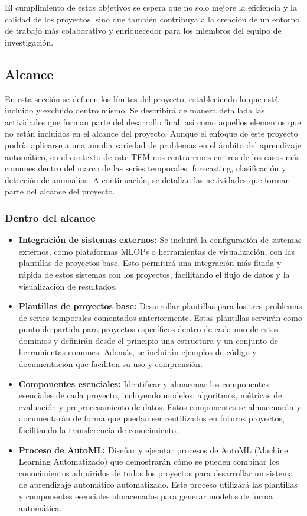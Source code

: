 El cumplimiento de estos objetivos se espera que no solo mejore la eficiencia y la calidad de los 
proyectos, sino que también contribuya a la creación de un entorno de trabajo más colaborativo y
enriquecedor para los miembros del equipo de investigación.

\subsection{Alcance}
En esta sección se definen los límites del proyecto, estableciendo lo que está
incluido y excluido dentro mismo. Se describirá de manera detallada las
actividades que forman parte del desarrollo final, así como aquellos elementos
que no están incluidos en el alcance del proyecto. Aunque el enfoque de este 
proyecto podría aplicarse a una amplia variedad de problemas en el ámbito del 
aprendizaje automático, en el contexto de este TFM nos centraremos en tres de 
los casos más comunes dentro del marco de las series temporales: forecasting, 
clasificación y detección de anomalías. A continuación, se detallan las 
actividades que forman parte del alcance del proyecto.

\subsubsection{Dentro del alcance}
\begin{itemize}
    \item \textbf{Integración de sistemas externos:} Se incluirá la configuración de sistemas 
    externos, como plataformas MLOPs o herramientas de visualización, con las plantillas 
    de proyectos base. Esto permitirá una integración más fluida y rápida de estos sistemas con 
    los proyectos, facilitando el flujo de datos y la visualización de resultados.
    \item \textbf{Plantillas de proyectos base:} Desarrollar plantillas para 
    los tres problemas de series temporales comentados anteriormente. Estas plantillas 
    servirán como punto de partida para proyectos específicos dentro de cada uno de estos dominios
    y definirán desde el principio una estructura y un conjunto de herramientas comunes. Además,
    se incluirán ejemplos de código y documentación que faciliten su uso y comprensión.
    \item \textbf{Componentes esenciales:} Identificar y almacenar los componentes 
    esenciales de cada proyecto, incluyendo modelos, algoritmos, métricas de evaluación y
    preprocesamiento de datos. Estos componentes se almacenarán y documentarán de forma
    que puedan ser reutilizados en futuros proyectos, facilitando la transferencia de conocimiento.
    \item \textbf{Proceso de AutoML:} Diseñar y ejecutar procesos de AutoML 
    (Machine Learning Automatizado) que demostrarán cómo se pueden combinar los conocimientos 
    adquiridos de todos los proyectos para desarrollar un sistema de aprendizaje automático 
    automatizado. Este proceso utilizará las plantillas y componentes esenciales almacenados 
    para generar modelos de forma automática.
\end{itemize}

